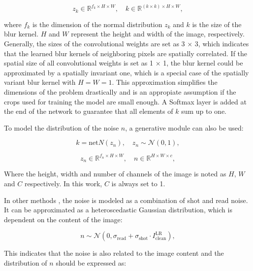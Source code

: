     \begin{equation}
        z_k \in \mathbb{R}^{f_k \times H \times W}, \quad k \in \mathbb{R}^{(k \times k) \times H \times W},
    \end{equation}

    where $f_k$ is the dimension of the normal distribution $z_k$ and $k$ is the size of the blur kernel. $H$ and $W$ represent the height and width of the image, respectively.
    Generally, the sizes of the convolutional weights are set as 3 × 3, which indicates that the learned blur kernels of neighboring pixels are spatially correlated.
    If the spatial size of all convolutional weights is set as 1 × 1, the blur kernel could be approximated by a spatially invariant one, which is a special case of the spatially variant blur kernel with $H = W = 1$.
    This approximation simplifies the dimensions of the problem drastically and is an appropiate assumption if the crops used for training the model are small enough.
    A Softmax layer is added at the end of the network to guarantee that all elements of $k$ sum up to one.
    
    
    To model the distribution of the noise $n$, a  generative module can also be used:

    \begin{equation}
        k = \text{net}N(z_n), \quad z_n \sim \mathcal{N}(0,1),
    \end{equation}

    \begin{equation}
        z_n \in \mathbb{R}^{f_n \times H \times W}, \quad n \in \mathbb{R}^{H \times W \times c},
    \end{equation}

    Where the height, width and number of channels of the image is noted as $H$, $W$ and $C$ respectively. 
    In this work, $C$ is always set to 1.

    In other methods \cite{plotz2017benchmarking}, the noise is modeled as a combination of shot and read noise. 
    It can be approximated as a heteroscedastic Gaussian distribution, which is dependent on the content of the image:

    \begin{equation}
        n \sim \mathcal{N}(0, \sigma_{\text{read}} + \sigma_{\text{shot}} \cdot I^{\text{LR}}_{\text{clean}}),
    \end{equation}

    This indicates that the noise is also related to the image content and the distribution of $n$ should be expressed as:


